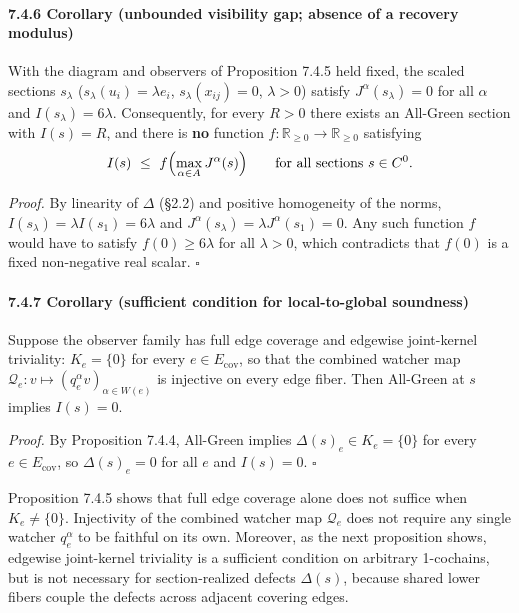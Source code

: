 \documentclass[
  11pt,
]{article}
\begin{document}
\paragraph{7.4.6 Corollary (unbounded visibility gap; absence of a recovery modulus)}\label{corollary-unbounded-visibility-gap-absence-of-a-recovery-modulus}

With the diagram and observers of Proposition 7.4.5 held fixed, the scaled sections \(s_\lambda\) (\(s_\lambda(u_i)=\lambda e_i\), \(s_\lambda(x_{ij})=0\), \(\lambda>0\)) satisfy \(J^\alpha(s_\lambda)=0\) for all \(\alpha\) and \(I(s_\lambda)=6\lambda\). Consequently, for every \(R>0\) there exists an All-Green section with \(I(s)=R\), and there is \textbf{no} function \(f:\mathbb R_{\ge0}\to\mathbb R_{\ge0}\) satisfying
\[
I(s)\ \le\ f\Bigl(\max_{\alpha\in A}J^\alpha(s)\Bigr)
\qquad\text{for all sections } s\in C^0.
\]

\emph{Proof.} By linearity of \(\Delta\) (§2.2) and positive homogeneity of the norms, \(I(s_\lambda)=\lambda I(s_1)=6\lambda\) and \(J^\alpha(s_\lambda)=\lambda J^\alpha(s_1)=0\). Any such function \(f\) would have to satisfy \(f(0)\ge 6\lambda\) for all \(\lambda>0\), which contradicts that \(f(0)\) is a fixed non-negative real scalar. \(\square\)

\paragraph{7.4.7 Corollary (sufficient condition for local-to-global soundness)}\label{corollary-sufficient-condition-for-local-to-global-soundness}

Suppose the observer family has full edge coverage and edgewise joint-kernel triviality: \(K_e=\{0\}\) for every \(e\in E_{\mathrm{cov}}\), so that the combined watcher map \(\mathcal Q_e: v \longmapsto (q_e^\alpha v)_{\alpha \in W(e)}\) is injective on every edge fiber. Then All-Green at \(s\) implies \(I(s)=0\).

\emph{Proof.} By Proposition 7.4.4, All-Green implies \(\Delta(s)_e\in K_e=\{0\}\) for every \(e\in E_{\mathrm{cov}}\), so \(\Delta(s)_e=0\) for all \(e\) and \(I(s)=0\). \(\square\)

Proposition 7.4.5 shows that full edge coverage alone does not suffice when \(K_e\neq\{0\}\). Injectivity of the combined watcher map \(\mathcal Q_e\) does not require any single watcher \(q_e^\alpha\) to be faithful on its own. Moreover, as the next proposition shows, edgewise joint-kernel triviality is a sufficient condition on arbitrary 1-cochains, but is not necessary for section-realized defects \(\Delta(s)\), because shared lower fibers couple the defects across adjacent covering edges.
\end{document}
